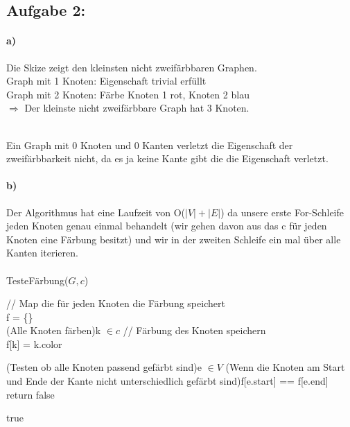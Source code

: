 \documentclass[a4paper]{article}
\begin{document}
\subsection*{Aufgabe 2:}

\paragraph{a)}

Die Skize zeigt den kleinsten nicht zweifärbbaren Graphen. \\
Graph mit 1 Knoten: Eigenschaft trivial erfüllt \\
Graph mit 2 Knoten: Färbe Knoten 1 rot, Knoten 2 blau \\
$\Rightarrow$ Der kleinste nicht zweifärbbare Graph hat 3 Knoten.

\\
Ein Graph mit 0 Knoten und 0 Kanten verletzt die Eigenschaft der zweifärbbarkeit
nicht, da es ja keine Kante gibt die die Eigenschaft verletzt.
\paragraph{b)}
Der Algorithmus hat eine Laufzeit von O($|V| + |E|$) da unsere erste For-Schleife jeden 
Knoten genau einmal behandelt (wir gehen davon aus das c für jeden Knoten eine Färbung
besitzt) und wir in der zweiten Schleife ein mal über alle Kanten iterieren. \\
\\
\noindent TesteFärbung($G, c$)\\
\begin{algorithm}[H]
	// Map die für jeden Knoten die Färbung speichert \\
	f = \{\} \\
	\ForEach(Alle Knoten färben){k $\in c $}{
		// Färbung des Knoten speichern \\
		f[k] = k.color \\
	}

	\ForEach(Testen ob alle Knoten passend gefärbt sind){e $\in V$} {
		\If(Wenn die Knoten am Start und Ende der Kante nicht 
		unterschiedlich gefärbt sind){f[e.start] == f[e.end]}{
			return false
		}
	}

	\Return true \\
\end{algorithm}
\end{document}
